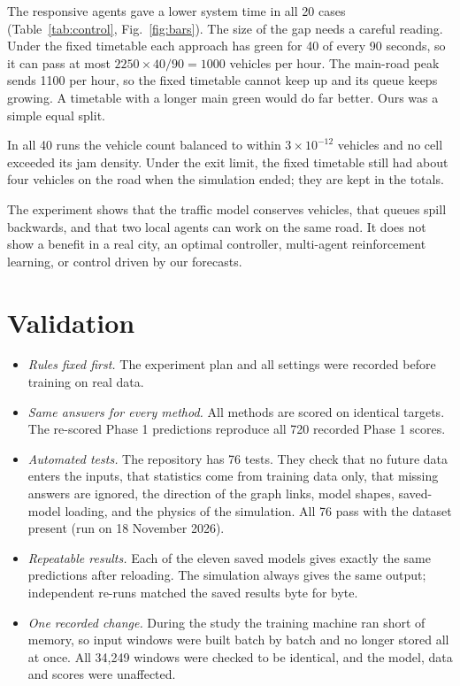\documentclass[conference]{IEEEtran}
\begin{document}
The responsive agents gave a lower system time in all 20 cases (Table~\ref{tab:control}, Fig.~\ref{fig:bars}). The size of the gap needs a careful reading. Under the fixed timetable each approach has green for 40 of every 90 seconds, so it can pass at most $2250\times40/90=1000$ vehicles per hour. The main-road peak sends 1100 per hour, so the fixed timetable cannot keep up and its queue keeps growing. A timetable with a longer main green would do far better. Ours was a simple equal split.

In all 40 runs the vehicle count balanced to within $3\times10^{-12}$ vehicles and no cell exceeded its jam density. Under the exit limit, the fixed timetable still had about four vehicles on the road when the simulation ended; they are kept in the totals.

The experiment shows that the traffic model conserves vehicles, that queues spill backwards, and that two local agents can work on the same road. It does not show a benefit in a real city, an optimal controller, multi-agent reinforcement learning, or control driven by our forecasts.

\section{Validation}
\begin{itemize}
\item \emph{Rules fixed first.} The experiment plan and all settings were recorded before training on real data.
\item \emph{Same answers for every method.} All methods are scored on identical targets. The re-scored Phase 1 predictions reproduce all 720 recorded Phase 1 scores.
\item \emph{Automated tests.} The repository has 76 tests. They check that no future data enters the inputs, that statistics come from training data only, that missing answers are ignored, the direction of the graph links, model shapes, saved-model loading, and the physics of the simulation. All 76 pass with the dataset present (run on 18 November 2026).
\item \emph{Repeatable results.} Each of the eleven saved models gives exactly the same predictions after reloading. The simulation always gives the same output; independent re-runs matched the saved results byte for byte.
\item \emph{One recorded change.} During the study the training machine ran short of memory, so input windows were built batch by batch and no longer stored all at once. All 34,249 windows were checked to be identical, and the model, data and scores were unaffected.
\end{itemize}
\end{document}
